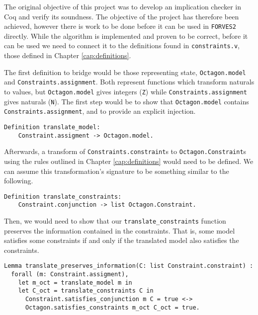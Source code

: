 The original objective of this project was to develop an implication checker in Coq
and verify its soundness. The objective of the project has therefore been achieved,
however there is work to be done before it can be used in \verb|FORVES2| directly.
While the algorithm is implemented and proven to be correct, before it can be used
we need to connect it to the definitions found in \texttt{constraints.v},
those defined in Chapter \ref{cap:definitions}.

The first definition to bridge would be those representing state, \texttt{Octagon.model} 
and \texttt{Constraints.assignment}. Both represent functions which transform naturals
to values, but \texttt{Octagon.model} gives integers (\texttt{Z}) while
\texttt{Constraints.assignment} gives naturals (\texttt{N}). The first
step would be to show that \texttt{Octagon.model} contains 
\texttt{Constraints.assignment}, and to provide an explicit injection.
\begin{verbatim}
Definition translate_model:
    Constraint.assigment -> Octagon.model.
\end{verbatim}

Afterwards, a transform of \texttt{Constraints.constraint}s to 
\texttt{Octagon.Constraint}s using the rules outlined in Chapter 
\ref{cap:definitions} would need to be defined. We can assume this transformation's
signature to be something similar to the following.
\begin{verbatim}
Definition translate_constraints: 
    Constraint.conjunction -> list Octagon.Constraint.
\end{verbatim}

\noindent Then, we would need to show that our \texttt{translate_constraints} function
preserves the information contained in the constraints. That is, some model satisfies some 
constraints if and only if the translated model also satisfies the constraints.

\begin{verbatim}
Lemma translate_preserves_information(C: list Constraint.constraint) :
  forall (m: Constraint.assigment),
    let m_oct = translate_model m in
    let C_oct = translate_constraints C in
      Constraint.satisfies_conjunction m C = true <->
      Octagon.satisfies_constraints m_oct C_oct = true.
\end{verbatim}

